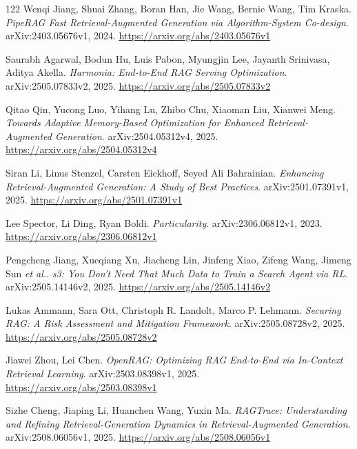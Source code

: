 \documentclass[11pt,a4paper]{article}
\begin{document}
\begin{thebibliography}{122}
Wenqi Jiang, Shuai Zhang, Boran Han, Jie Wang, Bernie Wang, Tim Kraska.
\newblock \emph{PipeRAG Fast Retrieval-Augmented Generation via Algorithm-System Co-design}.
\newblock arXiv:2403.05676v1, 2024.
\newblock \url{https://arxiv.org/abs/2403.05676v1}

Saurabh Agarwal, Bodun Hu, Luis Pabon, Myungjin Lee, Jayanth Srinivasa, Aditya Akella.
\newblock \emph{Harmonia: End-to-End RAG Serving Optimization}.
\newblock arXiv:2505.07833v2, 2025.
\newblock \url{https://arxiv.org/abs/2505.07833v2}

Qitao Qin, Yucong Luo, Yihang Lu, Zhibo Chu, Xiaoman Liu, Xianwei Meng.
\newblock \emph{Towards Adaptive Memory-Based Optimization for Enhanced Retrieval-Augmented Generation}.
\newblock arXiv:2504.05312v4, 2025.
\newblock \url{https://arxiv.org/abs/2504.05312v4}

Siran Li, Linus Stenzel, Carsten Eickhoff, Seyed Ali Bahrainian.
\newblock \emph{Enhancing Retrieval-Augmented Generation: A Study of Best Practices}.
\newblock arXiv:2501.07391v1, 2025.
\newblock \url{https://arxiv.org/abs/2501.07391v1}

Lee Spector, Li Ding, Ryan Boldi.
\newblock \emph{Particularity}.
\newblock arXiv:2306.06812v1, 2023.
\newblock \url{https://arxiv.org/abs/2306.06812v1}

Pengcheng Jiang, Xueqiang Xu, Jiacheng Lin, Jinfeng Xiao, Zifeng Wang, Jimeng Sun \emph{et al.}.
\newblock \emph{s3: You Don't Need That Much Data to Train a Search Agent via RL}.
\newblock arXiv:2505.14146v2, 2025.
\newblock \url{https://arxiv.org/abs/2505.14146v2}

Lukas Ammann, Sara Ott, Christoph R. Landolt, Marco P. Lehmann.
\newblock \emph{Securing RAG: A Risk Assessment and Mitigation Framework}.
\newblock arXiv:2505.08728v2, 2025.
\newblock \url{https://arxiv.org/abs/2505.08728v2}

Jiawei Zhou, Lei Chen.
\newblock \emph{OpenRAG: Optimizing RAG End-to-End via In-Context Retrieval Learning}.
\newblock arXiv:2503.08398v1, 2025.
\newblock \url{https://arxiv.org/abs/2503.08398v1}

Sizhe Cheng, Jiaping Li, Huanchen Wang, Yuxin Ma.
\newblock \emph{RAGTrace: Understanding and Refining Retrieval-Generation Dynamics in Retrieval-Augmented Generation}.
\newblock arXiv:2508.06056v1, 2025.
\newblock \url{https://arxiv.org/abs/2508.06056v1}


\end{thebibliography}
\end{document}
